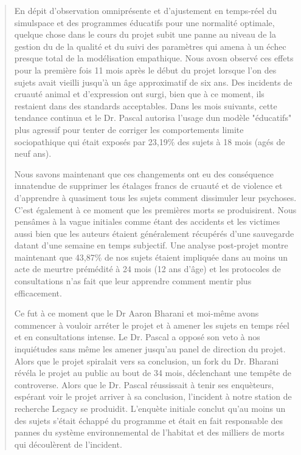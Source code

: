 \begin{quotation}
En dépit d'observation omniprésente et d'ajustement en temps-réel du simulspace et des programmes éducatifs pour une normalité optimale, quelque chose dans le cours du projet subit une panne au niveau de la gestion du de la qualité et du suivi des paramètres qui amena à un échec presque total de la modélisation empathique. Nous avosn observé ces effets pour la première fois 11 mois après le début du projet lorsque l'on des sujets avait vieilli jusqu'à un âge approximatif de six ans. Des incidents de cruauté animal et d'expression ont surgi, bien que à ce moment, ils restaient dans des standards acceptables. Dans les mois suivants, cette tendance continua et le Dr. Pascal autorisa l'usage dun modèle "éducatifs" plus agressif pour tenter de corriger les comportements limite sociopathique qui était exposés par 23,19\% des sujets à 18 mois (agés de neuf ans). 

Nous savons maintenant que ces changements ont eu des conséquence innatendue de supprimer les étalages francs de cruauté et de violence et d'apprendre à quasiment tous les sujets comment dissimuler leur psychoses. C'est également à ce moment que les premières morts se produisirent. Nous pensâmes à la vague initiales comme étant des accidents et les victimes aussi bien que les auteurs étaient généralement récupérés d'une sauvegarde datant d'une semaine en temps subjectif. Une analyse post-projet montre maintenant que 43,87\% de nos sujets étaient impliquée dans au moins un acte de meurtre prémédité à 24 mois (12 ans d'âge) et les protocoles de consultations n'as fait que leur apprendre comment mentir plus efficacement. 

Ce fut à ce moment que le Dr Aaron Bharani et moi-même avons commencer à vouloir arréter le projet et à amener les sujets en temps réel et en consultations intense. Le Dr. Pascal a opposé son veto à nos inquiétudes sans même les amener jusqu'au panel de direction du projet. Alors que le projet spiralait vers sa conclusion, un fork du Dr. Bharani révéla le projet au public au bout de 34 mois, déclenchant une tempête de controverse. Alors que le Dr. Pascal réussissait à tenir ses enquèteurs, espérant voir le projet arriver à sa conclusion, l'incident à notre station de recherche Legacy se produidit. L'enquète initiale conclut qu'au moins un des sujets s'était échappé du programme et était en fait responsable des pannes du système environnemental de l'habitat et des milliers de morts qui découlèrent de l'incident. 


\end{quotation}

